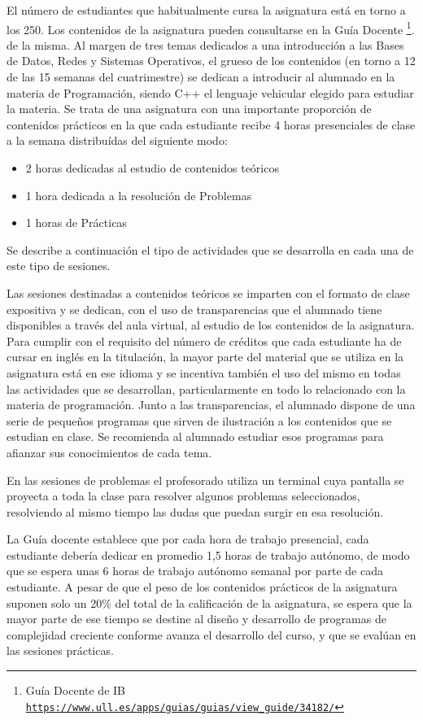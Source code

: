 \documentclass[twocolumn,twoside,a4paper, 10pt]{article}
\begin{document}
El número de estudiantes que habitualmente cursa la asignatura está en torno a los 250. 
Los contenidos de la asignatura pueden consultarse en la Guía Docente
\footnote{Guía Docente de IB\\ \href{https://www.ull.es/apps/guias/guias/view_guide/34182/}{\scriptsize{\texttt{https://www.ull.es/apps/guias/guias/view\_guide/34182/}}}}.
de la misma.
Al margen de tres temas dedicados a una introducción a las Bases de Datos, Redes y Sistemas Operativos,
el grueso de los contenidos (en torno a 12 de las 15 semanas del cuatrimestre) se dedican a introducir al
alumnado en la materia de Programación, siendo C++ el lenguaje vehicular elegido para estudiar la materia.
Se trata de una asignatura con una importante proporción de contenidos prácticos en la que cada estudiante
recibe 4 horas presenciales de clase a la semana distribuídas del siguiente modo:
\begin{itemize}
  \item 2 horas dedicadas al estudio de contenidos teóricos
  \item 1 hora dedicada a la resolución de Problemas
  \item 1 horas de Prácticas
\end{itemize}
Se describe a continuación el tipo de actividades que se desarrolla en cada una de este tipo de sesiones.

Las sesiones destinadas a contenidos teóricos se imparten con el formato de clase expositiva y se dedican, 
con el uso de transparencias que el alumnado tiene disponibles a través del aula virtual, al estudio de los 
contenidos de la asignatura. 
Para cumplir con el requisito del número de créditos que cada estudiante ha de cursar en inglés en la 
titulación, la mayor parte del material que se utiliza en la asignatura está en ese idioma y se incentiva 
también el uso del mismo en todas las actividades que se desarrollan, particularmente en todo lo relacionado 
con la materia de programación.
Junto a las transparencias, el alumnado dispone de una serie de pequeños programas que sirven de ilustración a
los contenidos que se estudian en clase. 
Se recomienda al alumnado estudiar esos programas para afianzar sus conocimientos de cada tema.

En las sesiones de problemas el profesorado utiliza un terminal cuya pantalla se proyecta a toda la clase para
resolver algunos problemas seleccionados, resolviendo al mismo tiempo las dudas que puedan surgir en esa
resolución. 

La Guía docente establece que por cada hora de trabajo presencial, cada estudiante debería dedicar en 
promedio 1,5 horas de trabajo autónomo, de modo que se espera unas 6 horas de trabajo autónomo semanal por 
parte de cada estudiante. 
A pesar de que el peso de los contenidos prácticos de la asignatura suponen solo un 20\% del total de la
calificación de la asignatura, se espera que la mayor parte de ese tiempo se destine al diseño y desarrollo 
de programas de complejidad creciente conforme avanza el desarrollo del curso, y que se evalúan en las
sesiones prácticas.
\end{document}
